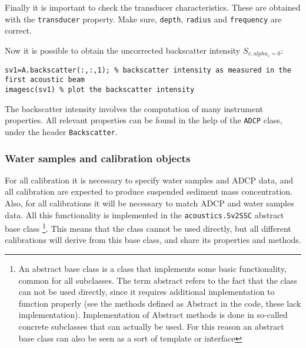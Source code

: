\documentclass[]{article}
\begin{document}
Finally it is important to check the transducer characteristics. These are obtained with the \lstinline!transducer! property. Make sure, \lstinline!depth!, \lstinline!radius! and \lstinline!frequency! are correct.

Now it is possible to obtain the uncorrected backscatter intensity $S_{v,alpha_s=0}$:
\begin{lstlisting}
sv1=A.backscatter(:,:,1); % backscatter intensity as measured in the first acoustic beam
imagesc(sv1) % plot the backscatter intensity
\end{lstlisting}

The backscatter intensity involves the computation of many instrument properties. All relevant properties can be found in the help of the \lstinline!ADCP! class, under the header \lstinline!Backscatter!.

\subsubsection{Water samples and calibration objects}
For all calibration it is necessary to specify water samples and ADCP data, and all calibration are expected to produce suspended sediment mass concentration. Also, for all calibrations it will be necessary to match ADCP and water samples data. All this functionality is implemented in the \lstinline!acoustics.Sv2SSC! abstract base class \footnote{An abstract base class is a class that implements some basic functionality, common for all subclasses. The term abstract refers to the fact that the class can not be used directly, since it requires additional implementation to function properly (see the methods defined as Abstract in the code, these lack implementation). Implementation of Abstract methods is done in so-called concrete subclasses that can actually be used. For this reason an abstract base class can also be seen as a sort of template or interface}. This means that the class cannot be used directly, but all different calibrations will derive from this base class, and share its properties and methods.
\end{document}
